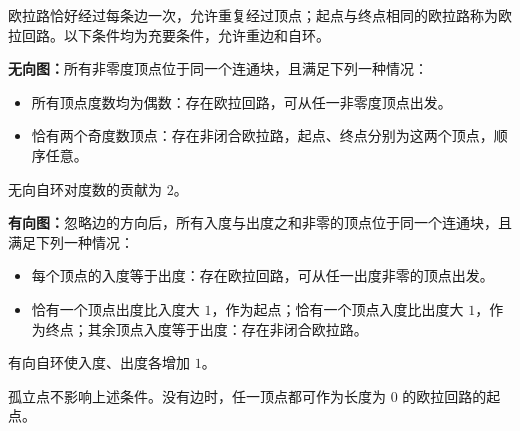 欧拉路恰好经过每条边一次，允许重复经过顶点；起点与终点相同的欧拉路称为欧拉回路。以下条件均为充要条件，允许重边和自环。

\textbf{无向图：}所有非零度顶点位于同一个连通块，且满足下列一种情况：
\begin{itemize}
    \item 所有顶点度数均为偶数：存在欧拉回路，可从任一非零度顶点出发。
    \item 恰有两个奇度数顶点：存在非闭合欧拉路，起点、终点分别为这两个顶点，顺序任意。
\end{itemize}
无向自环对度数的贡献为 $2$。

\textbf{有向图：}忽略边的方向后，所有入度与出度之和非零的顶点位于同一个连通块，且满足下列一种情况：
\begin{itemize}
    \item 每个顶点的入度等于出度：存在欧拉回路，可从任一出度非零的顶点出发。
    \item 恰有一个顶点出度比入度大 $1$，作为起点；恰有一个顶点入度比出度大 $1$，作为终点；其余顶点入度等于出度：存在非闭合欧拉路。
\end{itemize}
有向自环使入度、出度各增加 $1$。

孤立点不影响上述条件。没有边时，任一顶点都可作为长度为 $0$ 的欧拉回路的起点。
